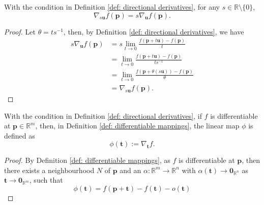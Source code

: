 \begin{theorem}
	\label{thm: directional derivatives: scalar multiplication}
	With the condition in Definition \ref{def: directional derivatives}, for any $s \in \mathbb R \setminus \{ 0 \}$,
	$$
	\nabla_{s\mathbf u}f(\mathbf p) = s\nabla_{\mathbf u} f(\mathbf p).
	$$
	
	\begin{proof}
		Let $\theta = ts^{-1}$, then, by Definition \ref{def: directional derivatives}, we have
		$$
		\begin{aligned}
			s\nabla_{\mathbf u} f(\mathbf p) &= s\lim_{t \to 0} \frac{f(\mathbf p + t\mathbf u) - f(\mathbf p)}{t} \\
			&= \lim_{t \to 0} \frac{f(\mathbf p + t\mathbf u) - f(\mathbf p)}{ts^{-1}} \\
			&= \lim_{t \to 0} \frac{f(\mathbf p + \theta (s \mathbf u)) - f(\mathbf p)}{\theta} \\
			&= \nabla_{s\mathbf u} f(\mathbf p).
		\end{aligned}
		$$
		
	\end{proof}
\end{theorem}


\begin{theorem}

	With the condition in Definition \ref{def: directional derivatives}, if $f$ is differentiable at $\mathbf p \in \mathbb R^m$, then, in Definition \ref{def: differentiable mappings}, the linear map $\phi$ is defined as
	$$
	\phi(\mathbf t) := \nabla_{\mathbf t} f.
	$$
	
	\begin{proof}
		By Definition \ref{def: differentiable mappings}, as $f$ is differentiable at $\mathbf p$, then there exists a neighbourhood $N$ of $\mathbf p$ and an $\alpha: \mathbb R^m \to \mathbb R^n$ with $\alpha(\mathbf t) \to \mathbf 0_{\mathbb R^n}$ as $\mathbf t \to \mathbf 0_{\mathbb R^m}$, such that
		$$
		\phi(\mathbf t) =f(\mathbf p + \mathbf t) - f(\mathbf t) - o(\mathbf t)
		$$
	\end{proof}
\end{theorem}


